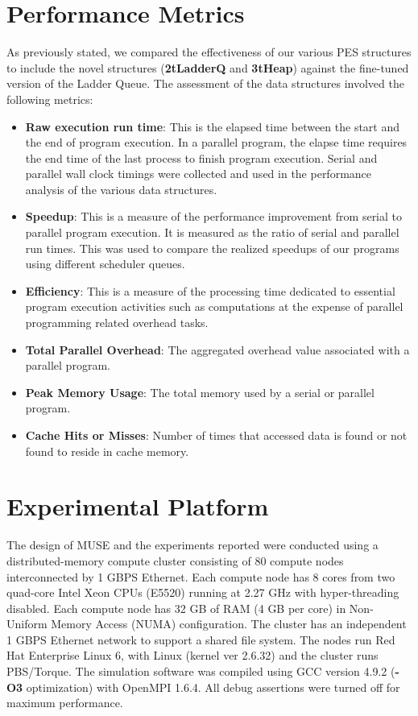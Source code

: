 \section{Performance Metrics}
As previously stated, we compared the effectiveness of our various PES structures to include the novel structures (\textbf{2tLadderQ} and \textbf{3tHeap}) against the fine-tuned version of the Ladder Queue. The assessment of the data structures involved the following metrics: 
\begin{itemize}
\item[\ding{182}] \textbf{Raw execution run time}: This is the elapsed time between the start and the end of program execution. In a parallel program, the elapse time requires the end time of the last process to finish program execution. Serial and parallel wall clock timings were collected and used in the performance analysis of the various data structures.
\item[\ding{183}] \textbf{Speedup}: This is a measure of the performance improvement from serial to parallel program execution. It is measured as the ratio of serial and parallel run times. This was used to compare the realized speedups of our programs using different scheduler queues.   
\item[\ding{184}] \textbf{Efficiency}: This is a measure of the processing time dedicated to essential program execution activities such as computations at the expense of parallel programming related overhead tasks. 
\item[\ding{185}] \textbf{Total Parallel Overhead}: The aggregated overhead value associated with a parallel program. 
\item[\ding{186}] \textbf{Peak Memory Usage}: The total memory used by a serial or parallel program.
\item[\ding{187}] \textbf{Cache Hits or Misses}: Number of times that accessed data is found or not found to reside in cache memory.
\end{itemize}

\section{Experimental Platform}
The design of MUSE and the experiments reported were conducted using a distributed-memory compute cluster consisting of 80 compute nodes interconnected by 1 GBPS Ethernet. Each compute node has 8 cores from two quad-core Intel Xeon \textregistered CPUs (E5520) running at 2.27 GHz with hyper-threading disabled. Each compute node has 32 GB of RAM (4 GB per core) in Non-Uniform Memory Access (NUMA) configuration. The cluster has an independent 1 GBPS Ethernet network to support a shared file system. The nodes run Red Hat Enterprise Linux 6, with Linux (kernel ver 2.6.32) and the cluster runs PBS/Torque. The simulation software was compiled using GCC version 4.9.2 (\textbf{-O3} optimization) with OpenMPI 1.6.4. All debug assertions were turned off for maximum performance.
